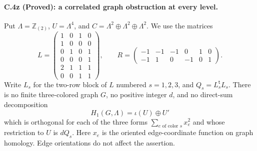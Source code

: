 \paragraph{C.4z (Proved): a correlated graph obstruction at every level.}
Put $\Lambda=\mathbb Z_{(2)}$, $U=\Lambda^4$, and
$C=\Lambda^2\oplus\Lambda^2\oplus\Lambda^2$. We use the matrices
\[
 L=\begin{pmatrix}
 1&0&1&0\\1&0&0&0\\0&1&0&1\\0&0&0&1\\
 2&1&1&1\\0&0&1&1
 \end{pmatrix},\qquad
 R=\begin{pmatrix}-1&-1&-1&0&1&0\\-1&1&0&-1&0&1\end{pmatrix}.
\]
Write $L_s$ for the two-row block of $L$ numbered $s=1,2,3$, and
$Q_s=L_s^{\mathsf t}L_s$. There is no finite three-colored graph $G$,
no positive integer $d$, and no direct-sum decomposition
\[
 H_1(G,\Lambda)=\iota(U)\oplus U'
\]
which is orthogonal for each of the three forms
$\sum_{e\text{ of color }s}x_e^2$ and whose restriction to $U$ is
$dQ_s$. Here $x_e$ is the oriented edge-coordinate function on graph
homology. Edge orientations do not affect the assertion.

